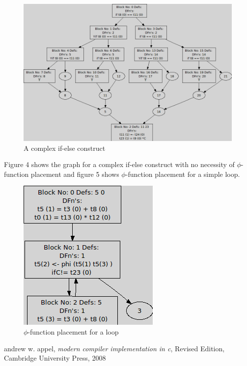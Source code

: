 \documentclass[10pt, oneside, a4paper]{article}
\begin{document}
\begin{figure}[htb]
\begin{center}
\ifpdf
	\includegraphics[scale=0.35]{./ifelse.png}
\else
\fi
\caption{A complex if-else construct}
\label{fig:4}
\end{center}
\end{figure}

Figure 4 shows the graph for a complex if-else construct with no necessity of $\phi$-function placement and figure 5 shows $\phi$-function placement for a simple loop.

\begin{figure}[htb]
\begin{center}
\ifpdf
	\includegraphics[scale=0.50]{./loop.png}
\else
\fi
\caption{$\phi$-function placement for a loop}
\label{fig:5}
\end{center}
\end{figure}

\begin{thebibliography}{10}
 andrew w. appel, \emph{modern compiler implementation in c}, Revised Edition, Cambridge University Press, 2008
\end{thebibliography}
\end{document}
